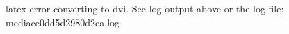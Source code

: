 \documentclass[preview]{standalone}
\begin{document}
\begin{center}
latex error converting to dvi. See log output above or the log file: media\Tex\5ce0dd5d2980d2ca.log
\end{center}
\end{document}

